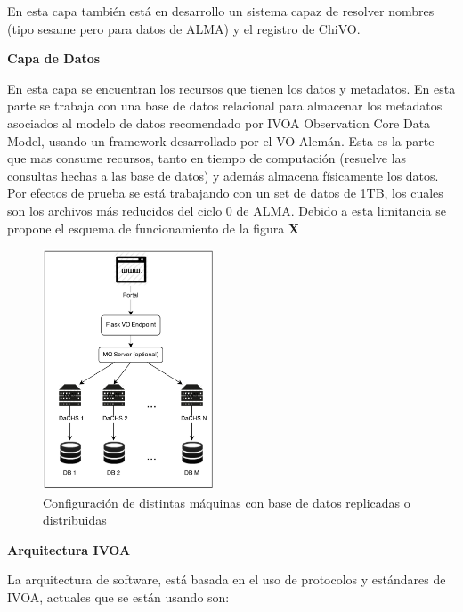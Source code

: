En esta capa también está en desarrollo un sistema capaz de resolver nombres
(tipo sesame pero para datos de ALMA) y el registro de ChiVO.

\textbf{Capa de Datos}

En esta capa se encuentran los recursos que tienen los datos y metadatos.
En esta parte se trabaja con una base de datos relacional para almacenar los
metadatos asociados al modelo de datos recomendado por IVOA Observation Core Data
Model, usando un framework desarrollado por el VO Alemán.
Esta es la parte que mas consume recursos, tanto en tiempo de computación (resuelve
las consultas hechas a las base de datos) y además almacena físicamente los datos.
Por efectos de prueba se está trabajando con un set de datos de 1TB, los cuales son
los archivos más reducidos del ciclo 0 de ALMA. Debido a esta limitancia se propone
el esquema de funcionamiento de la figura \textbf{X}

\begin{figure}[h]
    \centering
    \includegraphics[width=0.45\textwidth]{images/interaccion.png}
    \caption{Configuración de distintas máquinas con base de datos replicadas o distribuidas}
    \label{fig:dachs}
\end{figure}

\textbf{Arquitectura IVOA}

La arquitectura de software, está basada en el uso de protocolos y estándares de
IVOA, actuales que se están usando son:

